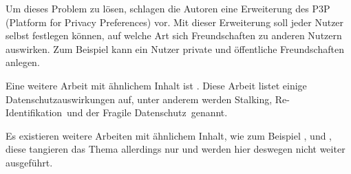 Um dieses Problem zu lösen, schlagen die Autoren eine Erweiterung des P3P (Platform for Privacy Preferences) vor. Mit dieser Erweiterung soll jeder Nutzer selbst festlegen können, auf welche Art sich Freundschaften zu anderen Nutzern auswirken. Zum Beispiel kann ein Nutzer private und öffentliche Freundschaften anlegen.


Eine weitere Arbeit mit ähnlichem Inhalt ist \citet{gross2005information}. Diese Arbeit listet einige Datenschutzauswirkungen auf, unter anderem werden \glqq Stalking\grqq , \glqq Re-Identifikation\grqq\ und der \glqq Fragile Datenschutz\grqq\ genannt.


Es existieren weitere Arbeiten mit ähnlichem Inhalt, wie zum Beispiel \citet{hintz2014AGB}, \citet{mahmood2011privacy} und \citet{hintzPhishing}, diese tangieren das Thema allerdings nur und werden hier deswegen nicht weiter ausgeführt.
